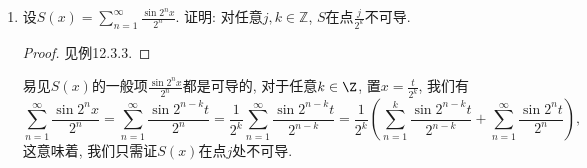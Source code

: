 \begin{quiza}
\begin{enumerate}
\begin{proof}
\textbf{Abel判别法.} 设对任意\(\boldsymbol{x}\in E\)与\(n\in\mathbb{N}_+\)
有\(\left|v_n(\boldsymbol{x})\right|\leqslant M\). 
因为\(\sum_{k=1}^{\infty}u_k(\boldsymbol{x})\)在\(E\)上一致收敛, 
所以\(\forall\varepsilon>0\), 存在\(N\)使得\(n>N\)时有
\(\left|\sum_{k=n+1}^{n+p}u_k(\boldsymbol{x})\right|<\frac{\varepsilon}{3M}\)
对任意\(\boldsymbol{x}\in E\)与\(p\in\mathbb{N}_+\)成立, 于是由Abel引理, 即得
\[\left|\sum_{k=n+1}^{n+p}u_k(\boldsymbol{x})v_k(\boldsymbol{x})\right|
\leqslant\frac{\varepsilon}{3M}\left(|v_{n+1}(\boldsymbol{x})|+2|v_{n+p}(\boldsymbol{x})|\right)<\varepsilon,\]
因而级数\(\sum_{k=1}^{\infty}u_k(\boldsymbol{x})v_k(\boldsymbol{x})\)在\(E\)上一致收敛.

\textbf{Dirichlet判别法.} 设对任意\(\boldsymbol{x}\in E\)与\(n\in\mathbb{N}_+\)
有\(\left|\sum_{k=1}^{n}u_k(\boldsymbol{x})\right|\leqslant M\). 
则对\(n+1\leqslant m\leqslant n+p\), 有
\[\left|\sum_{k=n+1}^{m}u_k(\boldsymbol{x})\right|
=\left|\sum_{k=1}^{m}u_k(\boldsymbol{x})
-\sum_{k=1}^{n}u_k(\boldsymbol{x})\right|
\leqslant\left|\sum_{k=1}^{m}u_k(\boldsymbol{x})\right|
+\left|\sum_{k=1}^{n}u_k(\boldsymbol{x})\right|\leqslant 2M,\]
另外, 由于\(\{v_k(\boldsymbol{x})\}\)在\(E\)上一致收敛到零, 
则对任意\(\varepsilon>0\), 有\(N\)使\(n>N\)时有
\(|v_n(\boldsymbol{x})|<\frac{\varepsilon}{6M}\), 于是结合Abel引理有
\[\left|\sum_{k=n+1}^{n+p}u_k(\boldsymbol{x})v_k(\boldsymbol{x})\right|
\leqslant 2M(|v_{n+1}(\boldsymbol{x})|+2|v_{n+p}(\boldsymbol{x})|)<\varepsilon,\]
因而级数\(\sum_{k=1}^{\infty}u_k(\boldsymbol{x})v_k(\boldsymbol{x})\)在\(E\)上一致收敛.
\end{proof}
\item 设\(S(x)=\sum_{n=1}^{\infty}\frac{\sin 2^nx}{2^n}\). 
证明: 对任意\(j,k\in\mathbb{Z}\), \(S\)在点\(\frac{j}{2^k}\)不可导.
\begin{proof}见例12.3.3.\end{proof}
\begin{proofc}[好像是错误的解答]
易见\(S(x)\)的一般项\(\frac{\sin 2^nx}{2^n}\)都是可导的, 
对于任意\(k\in\Z\), 置\(x=\frac{t}{2^k}\), 我们有
\[\sum_{n=1}^{\infty}\frac{\sin 2^nx}{2^n}
=\sum_{n=1}^{\infty}\frac{\sin 2^{n-k}t}{2^n}
=\frac{1}{2^k}\sum_{n=1}^{\infty}\frac{\sin 2^{n-k}t}{2^{n-k}}
=\frac{1}{2^{k}}\left(\sum_{n=1}^{k}\frac{\sin 2^{n-k}t}{2^{n-k}}
+\sum_{n=1}^{\infty}\frac{\sin 2^nt}{2^n}\right),\]
这意味着, 我们只需证\(S(x)\)在点\(j\)处不可导.


\end{proofc}
\end{enumerate}
\end{quiza}
